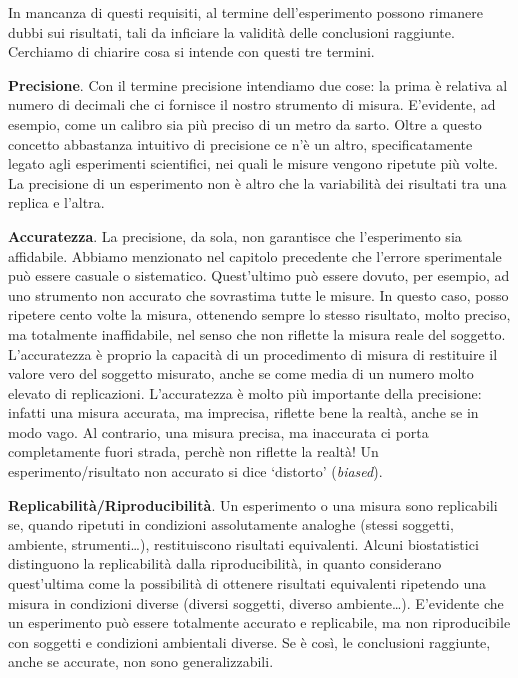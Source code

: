 \documentclass[a4paper,12pt,oneside]{book}
\theoremstyle{definition}
\theoremstyle{definition}
\theoremstyle{definition}
\theoremstyle{remark}
\begin{document}
In mancanza di questi requisiti, al termine dell'esperimento possono
rimanere dubbi sui risultati, tali da inficiare la validità delle
conclusioni raggiunte. Cerchiamo di chiarire cosa si intende con questi
tre termini.

\textbf{Precisione}. Con il termine precisione intendiamo due cose: la
prima è relativa al numero di decimali che ci fornisce il nostro
strumento di misura. E'evidente, ad esempio, come un calibro sia più
preciso di un metro da sarto. Oltre a questo concetto abbastanza
intuitivo di precisione ce n'è un altro, specificatamente legato agli
esperimenti scientifici, nei quali le misure vengono ripetute più volte.
La precisione di un esperimento non è altro che la variabilità dei
risultati tra una replica e l'altra.

\textbf{Accuratezza}. La precisione, da sola, non garantisce che
l'esperimento sia affidabile. Abbiamo menzionato nel capitolo precedente
che l'errore sperimentale può essere casuale o sistematico. Quest'ultimo
può essere dovuto, per esempio, ad uno strumento non accurato che
sovrastima tutte le misure. In questo caso, posso ripetere cento volte
la misura, ottenendo sempre lo stesso risultato, molto preciso, ma
totalmente inaffidabile, nel senso che non riflette la misura reale del
soggetto. L'accuratezza è proprio la capacità di un procedimento di
misura di restituire il valore vero del soggetto misurato, anche se come
media di un numero molto elevato di replicazioni. L'accuratezza è molto
più importante della precisione: infatti una misura accurata, ma
imprecisa, riflette bene la realtà, anche se in modo vago. Al contrario,
una misura precisa, ma inaccurata ci porta completamente fuori strada,
perchè non riflette la realtà! Un esperimento/risultato non accurato si
dice `distorto' (\emph{biased}).

\textbf{Replicabilità/Riproducibilità}. Un esperimento o una misura sono
replicabili se, quando ripetuti in condizioni assolutamente analoghe
(stessi soggetti, ambiente, strumenti\ldots{}), restituiscono risultati
equivalenti. Alcuni biostatistici distinguono la replicabilità dalla
riproducibilità, in quanto considerano quest'ultima come la possibilità
di ottenere risultati equivalenti ripetendo una misura in condizioni
diverse (diversi soggetti, diverso ambiente\ldots{}). E'evidente che un
esperimento può essere totalmente accurato e replicabile, ma non
riproducibile con soggetti e condizioni ambientali diverse. Se è così,
le conclusioni raggiunte, anche se accurate, non sono generalizzabili.
\end{document}
